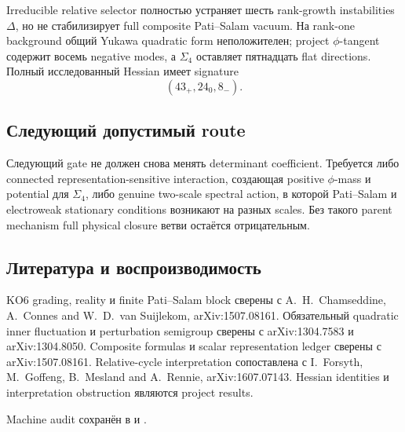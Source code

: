 \begin{theorem}
Irreducible relative selector полностью устраняет шесть rank-growth
instabilities \(\Delta\), но не стабилизирует full composite Pati--Salam
vacuum. На rank-one background общий Yukawa quadratic form неположителен;
project \(\phi\)-tangent содержит восемь negative modes, а
\(\Sigma_4\) оставляет пятнадцать flat directions. Полный исследованный
Hessian имеет signature
\begin{equation}
 \boxed{(43_+,24_0,8_-).}
\end{equation}
\end{theorem}

\subsection{Следующий допустимый route}

Следующий gate не должен снова менять determinant coefficient. Требуется
либо connected representation-sensitive interaction, создающая positive
\(\phi\)-mass и potential для \(\Sigma_4\), либо genuine two-scale spectral
action, в которой Pati--Salam и electroweak stationary conditions возникают
на разных scales. Без такого parent mechanism full physical closure ветви
остаётся отрицательным.

\subsection{Литература и воспроизводимость}

KO6 grading, reality и finite Pati--Salam block сверены с
A.~H.~Chamseddine, A.~Connes and W.~D.~van Suijlekom,
arXiv:1507.08161. Обязательный quadratic inner fluctuation и perturbation
semigroup сверены с arXiv:1304.7583 и arXiv:1304.8050. Composite formulas и
scalar representation ledger сверены с arXiv:1507.08161. Relative-cycle
interpretation сопоставлена с I.~Forsyth, M.~Goffeng, B.~Mesland and
A.~Rennie, arXiv:1607.07143. Hessian identities и interpretation obstruction
являются project results.

Machine audit сохранён в
 и
.